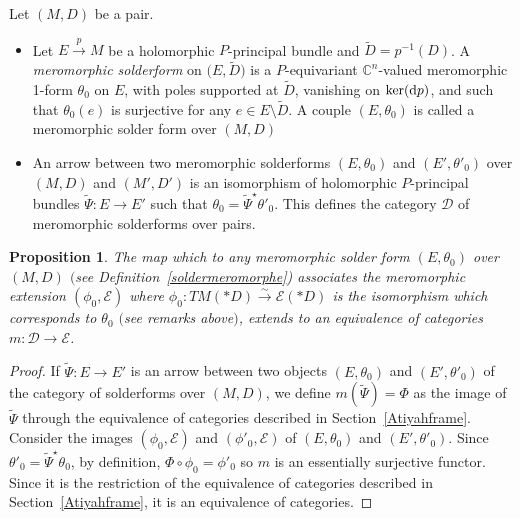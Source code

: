 \documentclass[10pt,a4paper]{amsart}
\numberwithin{equation}{section}
\newtheorem{Proposition}[Theorem]{Proposition}
 { \theoremstyle{definition}
\newtheorem{Definition}[Theorem]{Definition}
\newtheorem{Note}[Theorem]{Note}
\newtheorem{Exemple}[Theorem]{Example}
\newtheorem{Remark}[Theorem]{Remark} }
\begin{document}
\begin{Definition}\label{soldermeromorphe}Let $(M,D)$ be a pair.
\begin{itemize}\itemsep=0pt
\item[(1)] Let $E\overset{p}{\longrightarrow} M$ be a holomorphic $P$-principal bundle and $\tilde{D}=p^{-1}(D)$. A \textit{meromorphic solderform} on $\big(E,\tilde{D}\big)$ is a $P$-equivariant $\mathbb{C}^n$-valued meromorphic 1-form $\theta_0$ on $E$, with poles supported at $\tilde{D}$, vanishing on $\ker({\rm d}p)$, and such that $\theta_0(e)$ is surjective for any $e\in E\setminus \tilde{D}$. A couple $(E,\theta_0)$ is called a meromorphic solder form over $(M,D)$
\item[(2)] An arrow between two meromorphic solderforms $(E,\theta_0)$ and $(E',\theta'_0)$ over $(M,D)$ and $(M',D')$ is an isomorphism of holomorphic $P$-principal bundles $\tilde{\Psi}\colon E \longrightarrow E'$ such that $\theta_0 = \tilde{\Psi}^\star \theta'_0$. This defines the category $\mathcal{D}$ of meromorphic solderforms over pairs.
\end{itemize}
\end{Definition}

\begin{Proposition}\label{solderequivalence} The map which to any meromorphic solder form $(E,\theta_0)$ over $(M,D)$ $($see Definition~{\rm \ref{soldermeromorphe})} associates the meromorphic extension $(\phi_0,\mathcal{E})$ where $\phi_0\colon TM(* D) \overset{\sim}{\longrightarrow} \mathcal{E}(* D)$ is the isomorphism which corresponds to $\theta_0$ $($see remarks above$)$, extends to an equivalence of categories $m\colon \mathcal{D} \longrightarrow \mathcal{E}$.
 \end{Proposition}\begin{proof}
 If $\tilde{\Psi}\colon E \longrightarrow E'$ is an arrow between two objects $(E,\theta_0)$ and $(E',\theta'_0)$ of the category of solderforms over $(M,D)$, we define $m(\tilde{\Psi})=\Phi$ as the image of $\tilde{\Psi}$ through the equivalence of categories described in Section~\ref{Atiyahframe}. Consider the images $(\phi_0,\mathcal{E})$ and $(\phi'_0,\mathcal{E})$ of $(E,\theta_0)$ and $(E',\theta'_0)$. Since $\theta'_0 = \tilde{\Psi}^\star \theta_0$, by definition, $\Phi \circ \phi_0 = \phi'_0$ so $m$ is an essentially surjective functor. Since it is the restriction of the equivalence of categories described in Section~\ref{Atiyahframe}, it is an equivalence of categories.
\end{proof}
\end{document}
